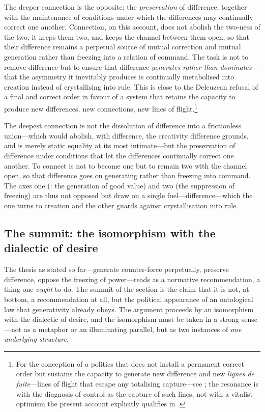 The deeper connection is the opposite: the \emph{preservation} of difference, together with the maintenance of conditions under which the differences may continually correct one another. Connection, on this account, does not abolish the two-ness of the two; it keeps them two, and keeps the channel between them open, so that their difference remains a perpetual source of mutual correction and mutual generation rather than freezing into a relation of command. The task is not to remove difference but to ensure that difference \emph{generates rather than dominates}---that the asymmetry it inevitably produces is continually metabolised into creation instead of crystallising into rule. This is close to the Deleuzean refusal of a final and correct order in favour of a system that retains the capacity to produce new differences, new connections, new lines of flight.\footnote{For the conception of a politics that does not install a permanent correct order but sustains the capacity to generate new difference and new \emph{lignes de fuite}---lines of flight that escape any totalising capture---see \textcite{deleuze1987}; the resonance is with the diagnosis of control as the capture of such lines, not with a vitalist optimism the present account explicitly qualifies in .}

\begin{claim}
The deepest connection is not the dissolution of difference into a frictionless union---which would abolish, with difference, the creativity difference grounds, and is merely static equality at its most intimate---but the preservation of difference under conditions that let the differences continually correct one another. To connect is not to become one but to remain two with the channel open, so that difference goes on generating rather than freezing into command. The axes one (: the generation of good value) and two (the suppression of freezing) are thus not opposed but draw on a single fuel---difference---which the one turns to creation and the other guards against crystallisation into rule.
\end{claim}

\subsection{The summit: the isomorphism with the dialectic of desire}
\label{p17:sub:balance-desire}

The thesis as stated so far---generate counter-force perpetually, preserve difference, oppose the freezing of power---reads as a normative recommendation, a thing one \emph{ought} to do. The summit of the section is the claim that it is not, at bottom, a recommendation at all, but the political appearance of an ontological law that generativity already obeys. The argument proceeds by an isomorphism with the dialectic of desire, and the isomorphism must be taken in a strong sense---not as a metaphor or an illuminating parallel, but as two instances of \emph{one underlying structure}.

